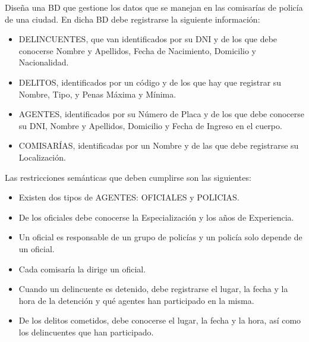 \begin{ejercicio} \label{ej:12}
    Diseña una BD que gestione los datos que se manejan en las comisarías de policía de una ciudad. En dicha BD
    debe registrarse la siguiente información:
    \begin{itemize}
        \item DELINCUENTES, que van identificados por su DNI y de los que debe conocerse Nombre y Apellidos, Fecha
        de Nacimiento, Domicilio y Nacionalidad.
        \item DELITOS, identificados por un código y de los que hay que registrar su Nombre, Tipo, y Penas Máxima y
        Mínima.
        \item AGENTES, identificados por su Número de Placa y de los que debe conocerse su DNI, Nombre y Apellidos,
        Domicilio y Fecha de Ingreso en el cuerpo.
        \item COMISARÍAS, identificadas por un Nombre y de las que debe registrarse su Localización.
    \end{itemize}
    Las restricciones semánticas que deben cumplirse son las siguientes:
    \begin{itemize}
        \item Existen dos tipos de AGENTES: OFICIALES y POLICIAS.
        \item De los oficiales debe conocerse la Especialización y los años de Experiencia.
        \item Un oficial es responsable de un grupo de policías y un policía solo depende de un oficial.
        \item Cada comisaría la dirige un oficial.
        \item Cuando un delincuente es detenido, debe registrarse el lugar, la fecha y la hora de la detención y qué
        agentes han participado en la misma.
        \item De los delitos cometidos, debe conocerse el lugar, la fecha y la hora, así como los delincuentes que han
        participado.
    \end{itemize}


\end{ejercicio}
